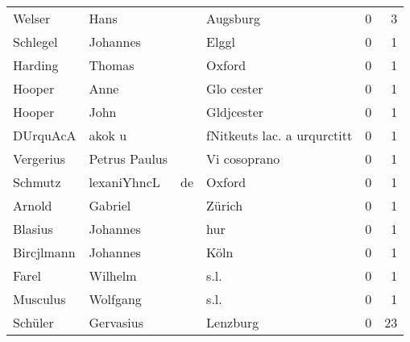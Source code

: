 \begin{tabular}{llllrr}
                   Welser &                               Hans &             &                                    Augsburg &          0 &         3 \\
                 Schlegel &                           Johannes &             &                                       Elggl &          0 &         1 \\
                  Harding &                             Thomas &             &                                      Oxford &          0 &         1 \\
                   Hooper &                               Anne &             &                                  Glo cester &          0 &         1 \\
                   Hooper &                               John &             &                                  Gldjcester &          0 &         1 \\
                 DUrquAcA &                             akok u &             &                 fNitkeuts lac. a urqurctitt &          0 &         1 \\
                Vergerius &                      Petrus Paulus &             &                                Vi cosoprano &          0 &         1 \\
                  Schmutz &                        lexaniYhncL &          de &                                      Oxford &          0 &         1 \\
                   Arnold &                            Gabriel &             &                                      Zürich &          0 &         1 \\
                  Blasius &                           Johannes &             &                                         hur &          0 &         1 \\
               Bircjlmann &                           Johannes &             &                                        Köln &          0 &         1 \\
                    Farel &                            Wilhelm &             &                                        s.l. &          0 &         1 \\
                 Musculus &                           Wolfgang &             &                                        s.l. &          0 &         1 \\
                  Schüler &                          Gervasius &             &                                    Lenzburg &          0 &        23 \\

\end{tabular}
